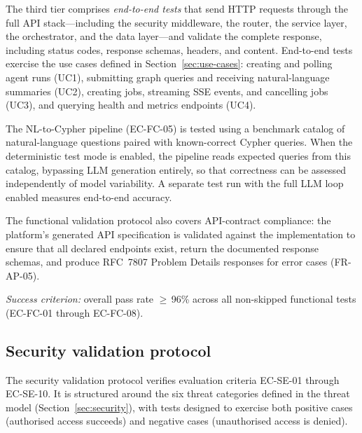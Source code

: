 \documentclass[a4paper]{sapthesis}
\begin{document}
The third tier comprises \emph{end-to-end tests} that send HTTP requests
through the full API stack---including the security middleware, the
router, the service layer, the orchestrator, and the data layer---and
validate the complete response, including status codes, response
schemas, headers, and content.  End-to-end tests exercise the use
cases defined in Section~\ref{sec:use-cases}: creating and polling agent
runs (UC1), submitting graph queries and receiving natural-language
summaries (UC2), creating jobs, streaming SSE events, and cancelling jobs
(UC3), and querying health and metrics endpoints (UC4).

The NL-to-Cypher pipeline (EC-FC-05) is tested using a benchmark catalog
of natural-language questions paired with known-correct Cypher queries.
When the deterministic test mode is enabled, the pipeline reads expected
queries from this catalog, bypassing LLM generation entirely, so that
correctness can be assessed independently of model variability.  A
separate test run with the full LLM loop enabled measures end-to-end
accuracy.

The functional validation protocol also covers API-contract compliance:
the platform's generated API specification is validated against the
implementation to ensure that all declared endpoints exist, return the
documented response schemas, and produce RFC~7807 Problem Details
responses for error cases (FR-AP-05).

\medskip
\noindent\emph{Success criterion:} overall pass rate $\geq$\,96\%
across all non-skipped functional tests (EC-FC-01 through EC-FC-08).

\subsection{Security validation protocol}
\label{sec:security-protocol}

The security validation protocol verifies evaluation criteria EC-SE-01
through EC-SE-10.  It is structured around the six threat categories
defined in the threat model (Section~\ref{sec:security}), with tests
designed to exercise both positive cases (authorised access succeeds) and
negative cases (unauthorised access is denied).
\end{document}
